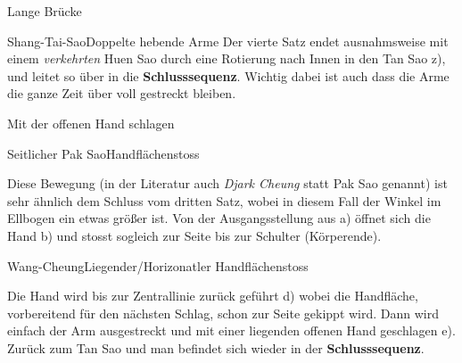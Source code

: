 \begin{WTSatz}{Lange Br\"ucke}
\begin{WTSatzTeil}{Shang-Tai-Sao}{Doppelte hebende Arme}
		Der vierte Satz endet ausnahmsweise mit einem \textit{verkehrten} Huen Sao durch eine Rotierung nach Innen in den Tan Sao z), und leitet so \"uber in die \textbf{Schlusssequenz}. Wichtig dabei ist auch dass die Arme die ganze Zeit \"uber voll gestreckt bleiben.
		
	\end{WTSatzTeil}
\end{WTSatz}


\begin{WTSatz}{Mit der offenen Hand schlagen}%

	
	\begin{WTSatzTeil}{Seitlicher Pak Sao}{Handfl\"achenstoss}

		Diese Bewegung (in der Literatur auch \textit{Djark Cheung} statt Pak Sao genannt) ist sehr \"ahnlich dem Schluss vom dritten Satz, wobei in diesem Fall der Winkel im Ellbogen ein etwas gr\"o{\ss}er ist. Von der Ausgangsstellung aus a) \"offnet sich die Hand b) und stosst sogleich zur Seite bis zur Schulter (K\"orperende).
		
		
	\end{WTSatzTeil}
	\begin{WTSatzTeil}{Wang-Cheung}{Liegender/Horizonatler Handfl\"achenstoss}
		
		Die Hand wird bis zur Zentrallinie zur\"uck gef\"uhrt d) wobei die Handfl\"ache, vorbereitend f\"ur den n\"achsten Schlag, schon zur Seite gekippt wird. Dann wird einfach der Arm ausgestreckt und mit einer liegenden offenen Hand geschlagen e). Zur\"uck zum Tan Sao und man befindet sich wieder in der \textbf{Schlusssequenz}.
		
	\end{WTSatzTeil}
\end{WTSatz}



